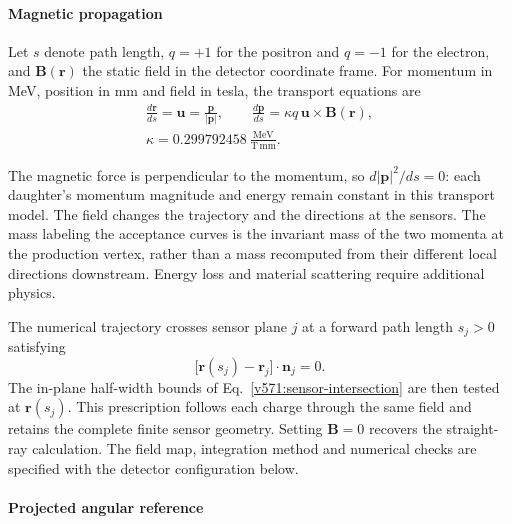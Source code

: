 \begin{samepage}
\paragraph{Magnetic propagation}
\label{v571:magnetic-propagation}
Let $s$ denote path length, $q=+1$ for the positron and $q=-1$ for the
electron, and $\boldsymbol B(\boldsymbol r)$ the static field in the detector
coordinate frame. For momentum in MeV, position in mm and field in tesla,
the transport equations are
\begin{equation}
 \begin{gathered}
  \frac{d\boldsymbol r}{ds}=\boldsymbol u
      =\frac{\boldsymbol p}{|\boldsymbol p|},\qquad
  \frac{d\boldsymbol p}{ds}
      =\kappa q\,\boldsymbol u\times\boldsymbol B(\boldsymbol r),\\[3pt]
  \kappa=0.299792458\ \frac{\mathrm{MeV}}{\mathrm{T\,mm}}.
 \end{gathered}
  \label{v571:magnetic-equations}
\end{equation}
\end{samepage}
The magnetic force is perpendicular to the momentum, so
$d|\boldsymbol p|^2/ds=0$: each daughter's momentum magnitude and energy
remain constant in this transport model. The field changes the trajectory
and the directions at the sensors. The mass labeling the acceptance curves
is the invariant mass of the two momenta at the production vertex, rather
than a mass recomputed from their different local directions downstream.
Energy loss and material scattering require additional physics.

The numerical trajectory crosses sensor plane $j$ at a forward path length
$s_j>0$ satisfying
\begin{equation}
  \bigl[\boldsymbol r(s_j)-\boldsymbol r_j\bigr]\cdot
  \boldsymbol n_j=0.
  \label{v571:curved-crossing}
\end{equation}
The in-plane half-width bounds of Eq.~\eqref{v571:sensor-intersection}
are then tested at $\boldsymbol r(s_j)$. This prescription follows each
charge through the same field and retains the complete finite sensor
geometry. Setting $\boldsymbol B=0$ recovers the straight-ray calculation.
The field map, integration method and numerical checks are specified with
the detector configuration below.

\paragraph{Projected angular reference}

